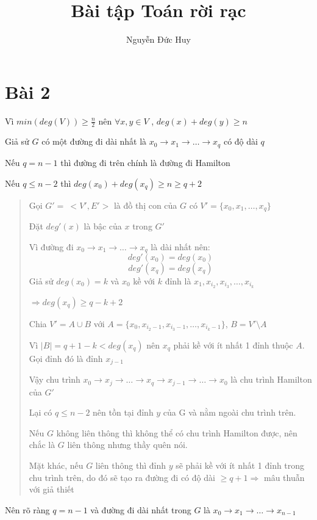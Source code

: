 \documentclass[10pt]{article}
\title{Bài tập Toán rời rạc}
\author{Nguyễn Đức Huy}
\begin{document}
\maketitle
\section{Bài 2}
\indent Vì $min (deg(V)) \geq \frac{n}{2}$ nên $\forall x, y \in V$ , $deg(x) + deg(y) \geq n$

Giả sử $G$ có một đường đi dài nhất là $x_0 \rightarrow x_1 \rightarrow \ldots \rightarrow x_q$ có độ dài $q$

Nếu $q = n - 1$ thì đường đi trên chính là đường đi Hamilton

Nếu $q \leq n - 2$ thì $deg(x_0) + deg(x_q) \geq n \geq q + 2$
\begin{quote}
    Gọi $G' =\ <V', E'>$ là đồ thị con của $G$ có $V' = \{x_0, x_1, \ldots , x_q\}$

    Đặt $deg'(x)$ là bậc của $x$ trong $G'$

    Vì đường đi $x_0 \rightarrow x_1 \rightarrow \ldots \rightarrow x_q$ là dài nhất nên:
    $$deg'(x_0) = deg(x_0)$$
    $$deg'(x_q) = deg(x_q)$$
    Giả sử $deg(x_0) = k$ và $x_0$ kề với $k$ đỉnh là $x_1, x_{i_2}, x_{i_3}, \ldots, x_{i_k}$

    $\Rightarrow deg(x_q) \geq  q - k + 2$

    Chia $V' = A \cup B$ với $A = \{x_0, x_{i_2-1}, x_{i_3-1}, \ldots, x_{i_k-1}\}$, $B = V'\setminus A$

    Vì $\vert B \vert = q + 1 - k < deg(x_q)$ nên $x_q$ phải kề với ít nhất 1 đỉnh thuộc $A$. Gọi đỉnh đó là đỉnh $x_{j-1}$

    Vậy chu trình $x_0 \rightarrow x_j \rightarrow \ldots \rightarrow x_q \rightarrow x_{j-1} \rightarrow \ldots \rightarrow x_0$ là chu trình Hamilton của $G'$

    Lại có $q \leq  n - 2$ nên tồn tại đỉnh $y$ của G và nằm ngoài chu trình trên.

    Nếu $G$ không liên thông thì không thể có chu trình Hamilton được, nên chắc là $G$ liên thông nhưng thầy quên nói.

    Mặt khác, nếu $G$ liên thông thì đỉnh $y$ sẽ phải kề với ít nhất 1 đỉnh trong chu trình trên, do đó sẽ tạo ra đường đi có độ dài $\geq  q + 1 \Rightarrow$ mâu thuẫn với giả thiết
\end{quote}

\indent Nên rõ ràng $q = n - 1$ và đường đi dài nhất trong $G$ là $x_0 \rightarrow x_1 \rightarrow \ldots \rightarrow x_{n-1}$
\end{document}
